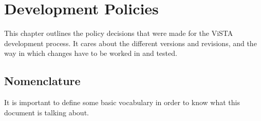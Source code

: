 


\section{Development Policies}

This chapter outlines the policy decisions that were made for the ViSTA development process.
It cares about the different versions and revisions, and the way in which changes have to be worked in and tested.

\subsection{Nomenclature}
It is important to define some basic vocabulary in order to know what this document is talking about.

